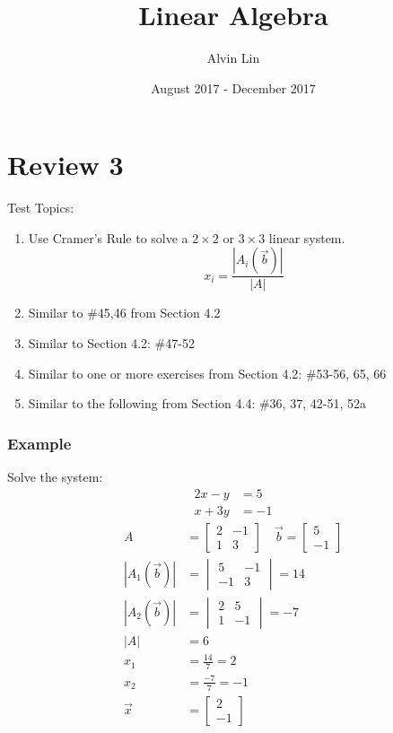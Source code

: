 \documentclass{math}
\title{Linear Algebra}
\author{Alvin Lin}
\date{August 2017 - December 2017}
\begin{document}
\maketitle

\section*{Review 3}
Test Topics:
\begin{enumerate}
  \item Use Cramer's Rule to solve a \( 2\times2 \) or \( 3\times3 \) linear
  system.
  \[ x_i = \frac{|A_i(\vec{b})|}{|A|} \]
  \item Similar to \#45,46 from Section 4.2
  \item Similar to Section 4.2: \#47-52
  \item Similar to one or more exercises from Section 4.2: \#53-56, 65, 66
  \item Similar to the following from Section 4.4: \#36, 37, 42-51, 52a
\end{enumerate}

\subsubsection*{Example}
Solve the system:
\begin{align*}
  2x-y &= 5 \\
  x+3y &= -1
\end{align*}
\begin{align*}
  A &= \begin{bmatrix}2 & -1 \\ 1 & 3\end{bmatrix} \quad
  \vec{b} = \begin{bmatrix}5 \\ -1\end{bmatrix} \\
  |A_1(\vec{b})| &= \begin{vmatrix}5 & -1 \\ -1 & 3\end{vmatrix} = 14 \\
  |A_2(\vec{b})| &= \begin{vmatrix}2 & 5 \\ 1 & -1\end{vmatrix} = -7 \\
  |A| &= 6 \\
  x_1 &= \frac{14}{7} = 2 \\
  x_2 &= \frac{-7}{7} = -1 \\
  \vec{x} &= \begin{bmatrix}2 \\ -1\end{bmatrix}
\end{align*}
\end{document}
